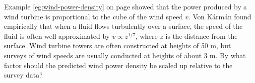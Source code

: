 Example \ref{eg:wind-power-density} on page \pageref{eg:wind-power-density}
showed that the power produced by a wind turbine is proportional to the cube
of the wind speed $v$. Von K\'arm\'an found empirically that when a fluid
flows turbulently over a surface, the speed of the fluid is often well approximated
by $v\propto z^{1/7}$, where $z$ is the distance from the surface. Wind turbine
towers are often constructed at heights of 50 m, but surveys of wind speeds are
usually conducted at heights of about 3 m. By what factor should the
predicted wind power density be scaled up relative to the survey data?\answercheck
